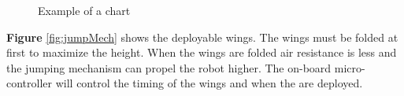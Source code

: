\begin{figure}[H]
\begin{center}
\caption{Example of a chart}
\label{fig:wings}
\end{center}
\end{figure} 

\indent \textbf{Figure} \ref{fig:jumpMech} shows the deployable wings. The wings must be folded at first to maximize the height. When the wings are folded air resistance is less and the jumping mechanism can propel the robot higher. The on-board micro-controller will control the timing of the wings and when the are deployed.\\